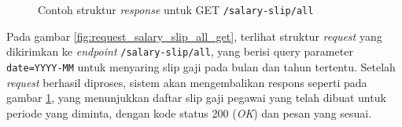 \begin{figure}
    \centering
    \caption{Contoh struktur \textit{response} untuk GET \texttt{/salary-slip/all}}
    \label{fig:response_salary_slip_all_get}
\end{figure}

Pada gambar \ref{fig:request_salary_slip_all_get}, terlihat struktur \textit{request} yang dikirimkan ke \textit{endpoint} \texttt{/salary-slip/all}, yang berisi query parameter \texttt{date=YYYY-MM} untuk menyaring slip gaji pada bulan dan tahun tertentu. Setelah \textit{request} berhasil diproses, sistem akan mengembalikan respons seperti pada gambar \ref{fig:response_salary_slip_all_get}, yang menunjukkan daftar slip gaji pegawai yang telah dibuat untuk periode yang diminta, dengan kode status 200 (\textit{OK}) dan pesan yang sesuai.

